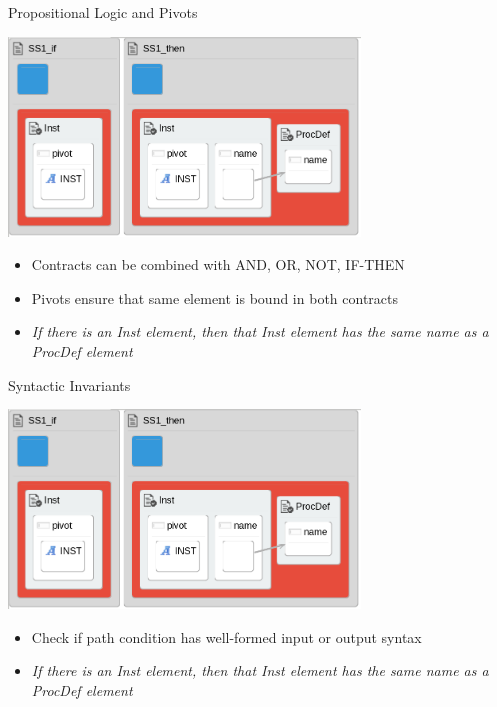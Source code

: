 \documentclass[xcolor=dvipsnames, 12pt, handout]{beamer}
\begin{document}
\begin{frame}{Propositional Logic and Pivots}
\begin{center}
\begin{center}
\includegraphics[width=0.7\textwidth]{figures/syntactic_invariant}
\end{center}
\end{center}
\pause
\begin{itemize}[<+->]
\item Contracts can be combined with AND, OR, NOT, IF-THEN
\item Pivots ensure that same element is bound in both contracts
\item  \textit{If there is an Inst element, then that Inst element has the same name as a ProcDef element}
\end{itemize}
\end{frame}

\begin{frame}{Syntactic Invariants}
\begin{center}
\includegraphics[width=0.7\textwidth]{figures/syntactic_invariant}
\end{center}
\begin{itemize}
\item Check if path condition has well-formed input or output syntax
\item \textit{If there is an Inst element, then that Inst element has the same name as a ProcDef element}
\end{itemize}
\end{frame}
\end{document}
